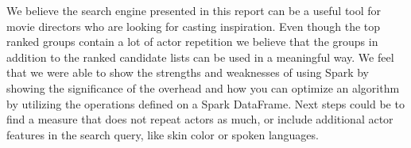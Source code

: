 We believe the search engine presented in this report can be a useful tool for movie directors who are looking for casting inspiration. Even though the top ranked groups contain a lot of actor repetition we believe that the groups in addition to the ranked candidate lists can be used in a meaningful way. We feel that we were able to show the strengths and weaknesses of using Spark by showing the significance of the overhead and how you can optimize an algorithm by utilizing the operations defined on a Spark DataFrame. Next steps could be to find a measure that does not repeat actors as much, or include additional actor features in the search query, like skin color or spoken languages.